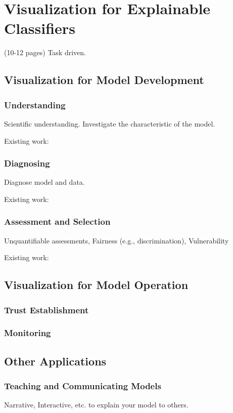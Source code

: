 \chapter{Visualization for Explainable Classifiers}\label{sec-visualization}

(10-12 pages) Task driven.

\section{Visualization for Model Development}

\subsection{Understanding}

Scientific understanding. Investigate the characteristic of the model.

Existing work:

\subsection{Diagnosing}

Diagnose model and data.

Existing work: 

\subsection{Assessment and Selection}

Unquantifiable assessments, Fairness (e.g., discrimination), Vulnerability

Existing work: 

\section{Visualization for Model Operation}
\subsection{Trust Establishment}
\subsection{Monitoring}

\section{Other Applications}
\subsection{Teaching and Communicating Models}
Narrative, Interactive, etc. to explain your model to others.
